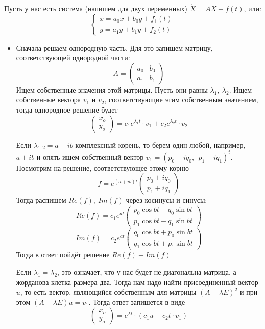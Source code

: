 \documentclass[11pt]{article}
\begin{document}
	Пусть у нас есть система (напишем для двух переменных) $\dot{X} = AX + f(t)$, или:
	$$\begin{cases}
		\dot{x} = a_0x + b_0y + f_1(t) \\
		\dot{y} = a_1y + b_1y + f_2(t)
	\end{cases}$$
	\begin{itemize}
		\item Сначала решаем однородную часть. Для это запишем матрицу, соответствующей однородной части:
		$$A = \begin{pmatrix}
			a_0 & b_0 \\
			a_1 & b_1
		\end{pmatrix}$$
		Ищем собственные значения этой матрицы. Пусть они равны $\lambda_1, \ \lambda_2$. Ищем собственные вектора $v_1$ и $v_2$, соответствующие этим собственным 
		значением, тогда однородное решение будет
		$$\begin{pmatrix}
			x_o \\ y_o
		\end{pmatrix} = c_1e^{\lambda_1t}\cdot v_1 + c_2e^{\lambda_2t}\cdot v_2$$

		Если $\lambda_{1, 2} = a \pm ib$ комплексный корень, то берем один любой, например, $a + ib$ и опять ищем собственный вектор $v_1 = (p_0 + iq_0, \ \ p_1 + iq_1)^t$. \\
		Посмотрим на решение, соответствующее этому корню
		$$f = e^{(a + ib)t} \begin{pmatrix}
			p_0 + iq_0 \\ p_1 + iq_1
		\end{pmatrix}$$
		Тогда распишем $Re(f), \ Im(f)$ через косинусы и синусы:
		$$Re(f) = c_1e^{at} \begin{pmatrix}
			p_0\cos bt - q_0 \sin bt \\
			p_1 \cos bt - q_1 \sin bt
		\end{pmatrix}$$
		$$Im(f) = c_2e^{at} \begin{pmatrix}
			q_0\cos bt + p_0 \sin bt \\
			q_1 \cos bt + p_1 \sin bt
		\end{pmatrix}$$
		Тогда в ответ пойдёт решение $Re(f) + Im(f)$

		Если $\lambda_1 = \lambda_2$, это означает, что у нас будет не диагональна матрица, а жорданова клетка размера два. Тогда
		нам надо найти присоединенный вектор $u$, то есть вектор, являющийся собственным для матрицы $(A - \lambda E)^2$ и при этом
		$(A - \lambda E)u = v_1$. Тогда ответ запишется в виде 
		$$\begin{pmatrix}
			x_o \\ y_o
		\end{pmatrix} = e^{\lambda t}\cdot (c_1 u + c_2 t \cdot v_1)$$


\end{itemize}
\end{document}
